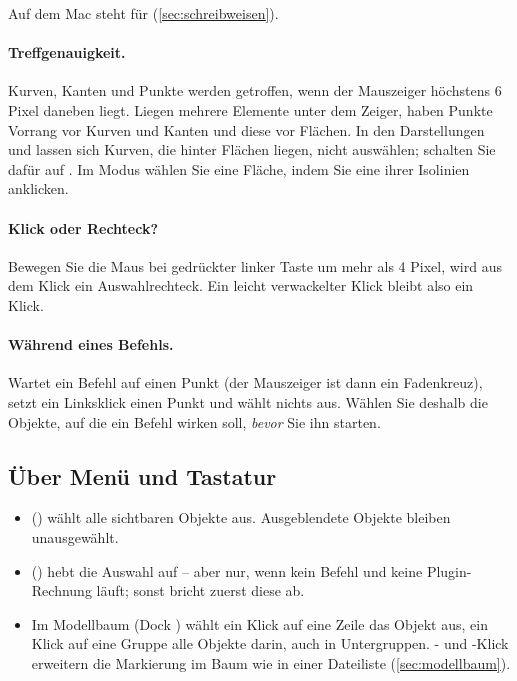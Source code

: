 Auf dem Mac steht  für  (\autoref{sec:schreibweisen}).

\paragraph{Treffgenauigkeit.} Kurven, Kanten und Punkte werden getroffen, wenn der
Mauszeiger höchstens 6 Pixel daneben liegt. Liegen mehrere Elemente unter dem Zeiger, haben
Punkte Vorrang vor Kurven und Kanten und diese vor Flächen. In den Darstellungen
 und  lassen sich Kurven, die hinter Flächen liegen, nicht
auswählen; schalten Sie dafür auf . Im Modus  wählen Sie eine
Fläche, indem Sie eine ihrer Isolinien anklicken.

\paragraph{Klick oder Rechteck?} Bewegen Sie die Maus bei gedrückter linker Taste um mehr als
4 Pixel, wird aus dem Klick ein Auswahlrechteck. Ein leicht verwackelter Klick bleibt also
ein Klick.

\paragraph{Während eines Befehls.} Wartet ein Befehl auf einen Punkt (der Mauszeiger ist dann
ein Fadenkreuz), setzt ein Linksklick einen Punkt und wählt nichts aus. Wählen Sie deshalb
die Objekte, auf die ein Befehl wirken soll, \emph{bevor} Sie ihn starten.

\subsection{Über Menü und Tastatur}

\begin{itemize}
  \item {} () wählt alle sichtbaren Objekte aus.
    Ausgeblendete Objekte bleiben unausgewählt.
  \item {} () hebt die Auswahl auf -- aber nur, wenn
    kein Befehl und keine Plugin-Rechnung läuft; sonst bricht  zuerst diese ab.
  \item Im Modellbaum (Dock ) wählt ein Klick auf eine Zeile das Objekt aus, ein
    Klick auf eine Gruppe alle Objekte darin, auch in Untergruppen. - und
    -Klick erweitern die Markierung im Baum wie in einer Dateiliste
    (\autoref{sec:modellbaum}).
\end{itemize}

